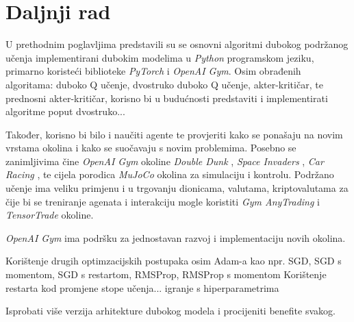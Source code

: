 \chapter{Daljnji rad}

U prethodnim poglavljima predstavili su se osnovni algoritmi dubokog podržanog učenja implementirani dubokim modelima u \textit{Python} programskom jeziku, primarno koristeći biblioteke \textit{PyTorch} i \textit{OpenAI Gym}. Osim obrađenih algoritama: duboko Q učenje, dvostruko duboko Q učenje, akter-kritičar, te prednosni akter-kritičar, korisno bi u budućnosti predstaviti i implementirati algoritme poput dvostruko...

Također, korisno bi bilo i naučiti agente te provjeriti kako se ponašaju na novim vrstama okolina i kako se suočavaju s novim problemima. Posebno se zanimljivima čine \textit{OpenAI Gym} okoline \textit{Double Dunk} \cite{https://www.gymlibrary.ml/environments/atari/double_dunk/}, \textit{Space Invaders} \cite{https://www.gymlibrary.ml/environments/atari/space_invaders/}, \textit{Car Racing} \cite{https://www.gymlibrary.ml/environments/box2d/car_racing/}, te cijela porodica \textit{MuJoCo} okolina za simulaciju i kontrolu. Podržano učenje ima veliku primjenu i u trgovanju dionicama, valutama, kriptovalutama za čije bi se treniranje agenata i interakciju mogle koristiti \textit{Gym AnyTrading} \cite{https://github.com/AminHP/gym-anytrading} i \textit{TensorTrade} \cite{https://github.com/tensortrade-org/tensortrade} okoline.

\textit{OpenAI Gym} ima podršku za jednostavan razvoj i implementaciju novih okolina. 

\bigskip

Korištenje drugih optimzacijskih postupaka osim Adam-a kao npr. SGD, SGD s momentom, SGD s restartom, RMSProp, RMSProp s momentom
Korištenje restarta kod promjene stope učenja... igranje s hiperparametrima

Isprobati više verzija arhitekture dubokog modela i procijeniti benefite svakog.
